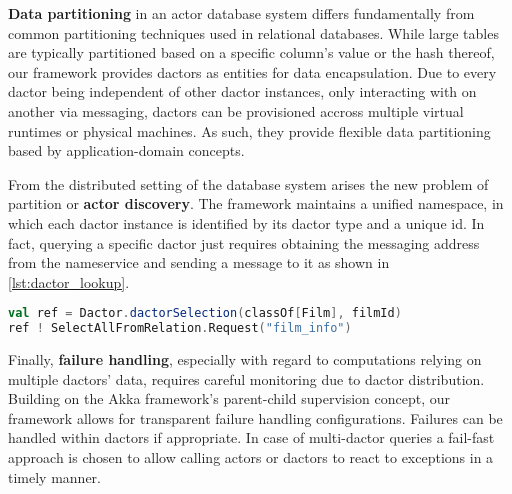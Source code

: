 \textbf{Data partitioning} in an actor database system differs fundamentally from common partitioning techniques used in relational databases.
While large tables are typically partitioned based on a specific column's value or the hash thereof, our framework provides \glspl{dactor} as entities for data encapsulation.
Due to every \gls{dactor} being independent of other \gls{dactor} instances, only interacting with on another via messaging, \glspl{dactor} can be provisioned accross multiple virtual runtimes or physical machines.
As such, they provide flexible data partitioning based by application-domain concepts.

From the distributed setting of the database system arises the new problem of partition or \textbf{actor discovery}.
The framework maintains a unified namespace, in which each \gls{dactor} instance is identified by its \gls{dactor} type and a unique id.
In fact, querying a specific \gls{dactor} just requires obtaining the messaging address from the nameservice and sending a message to it as shown in \cref{lst:dactor_lookup}.

\begin{minipage}{1.0\linewidth}
\begin{lstlisting}[caption=Lookup of and querying from a Film dactor instance., label=lst:dactor_lookup, language=Scala]
val ref = Dactor.dactorSelection(classOf[Film], filmId)
ref ! SelectAllFromRelation.Request("film_info")
\end{lstlisting}
\end{minipage}

Finally, \textbf{failure handling}, especially with regard to computations relying on multiple \glspl{dactor}' data, requires careful monitoring due to \gls{dactor} distribution.
Building on the Akka framework's parent-child supervision concept, our framework allows for transparent failure handling configurations.
Failures can be handled within \glspl{dactor} if appropriate.
In case of multi-\gls{dactor} queries a fail-fast approach is chosen to allow calling actors or \glspl{dactor} to react to exceptions in a timely manner.
